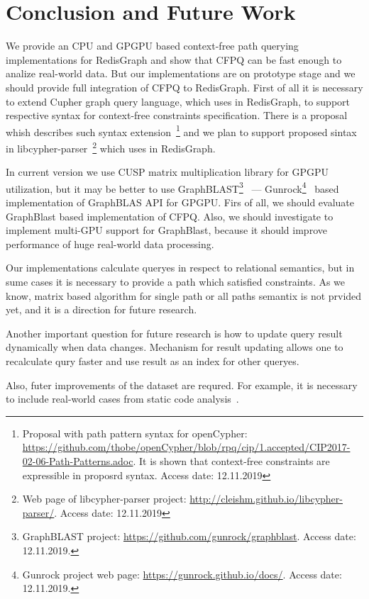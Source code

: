 \section{Conclusion and Future Work}

We provide an CPU and GPGPU based context-free path querying implementations for RedisGraph and show that CFPQ can be fast enough to analize real-world data.
But our implementations are on prototype stage and we should provide full integration of CFPQ to RedisGraph. 
First of all it is necessary to extend Cupher graph query language, which uses in RedisGraph, to support respective syntax for context-free constraints specification.
There is a proposal whish describes such syntax extension~\footnote{Proposal with path pattern syntax for openCypher: \url{https://github.com/thobe/openCypher/blob/rpq/cip/1.accepted/CIP2017-02-06-Path-Patterns.adoc}. It is shown that context-free constraints are expressible in proposrd syntax. Access date: 12.11.2019} and we plan to support proposed sintax in libcypher-parser~\footnote{Web page of libcypher-parser project: \url{http://cleishm.github.io/libcypher-parser/}. Access date: 12.11.2019} which uses in RedisGraph.

In current version we use CUSP matrix multiplication library for GPGPU utilization, but it may be better to use GraphBLAST\footnote{GraphBLAST project: \url{https://github.com/gunrock/graphblast}. Access date: 12.11.2019.}~\cite{yang2019graphblast} --- Gunrock\footnote{Gunrock project web page: \url{https://gunrock.github.io/docs/}. Access date: 12.11.2019.}~\cite{Wang:2017:GGG:3131890.3108140} based implementation of GraphBLAS API for GPGPU.
Firs of all, we should evaluate GraphBlast based implementation of CFPQ. 
Also, we should investigate to implement multi-GPU support for GraphBlast, because it should improve performance of huge real-world data processing.

Our implementations calculate queryes in respect to relational semantics, but in sume cases it is necessary to provide a path which satisfied constraints.
As we know, matrix based algorithm for single path or all paths semantix is not prvided yet, and it is a direction for future research.

Another important question for future research is how to update query result dynamically when data changes. 
Mechanism for result updating allows one to recalculate qury faster and use result as an index for other queryes.

Also, futer improvements of the dataset are requred.
For example, it is necessary to include real-world cases from static code analysis~\cite{!!!}.